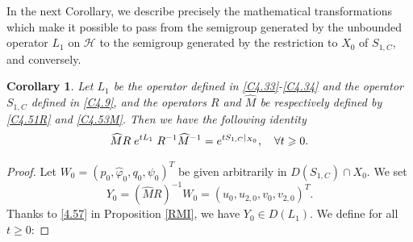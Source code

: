 \documentclass[10pt, english]{article}
\newtheorem{cor}[thm]{Corollary}
\begin{document}
{In the next Corollary, we describe precisely the mathematical transformations which make it possible to pass from the semigroup generated by the unbounded operator $L_1$ on $\mathcal{H}$ to the semigroup generated by the restriction to $X_0$ of $S_{1,C}$, and conversely.

\begin{cor}\label{Cor3}
Let $L_1$ be the operator defined in \eqref{C4.33}-\eqref{C4.34} and the operator $S_{1,C}$ defined in \eqref{C4.9}, and the operators $R$ and $\widehat{M}$ be respectively defined by \eqref{C4.51R} and \eqref{C4.53M}. Then we have the following
identity
\begin{equation}\label{4.58}%
\widehat{M}R\; e^{tL_1}\; R^{-1}\widehat{M}^{-1}=e^{tS_{1,C}\small{|}_{X_0}}, \quad \forall  t \geqslant 0.
\end{equation}
\end{cor}
\begin{proof}
Let $W_0=(p_0,\widehat{\varphi}_0, q_0, \psi_0)^T$ be given arbitrarily in $D(S_{1,C})\cap X_0$. We set 
\begin{equation}\label{4.59}%
Y_0=(\widehat{M}R)^{-1}W_0=(u_0,u_{2,0},v_0,v_{2,0})^T.
\end{equation}
Thanks to \eqref{4.57} in Proposition \ref{RMI}, we have $Y_0 \in D(L_1)$. We define for all $t\geqslant 0$: 


\end{proof}}
\end{document}
